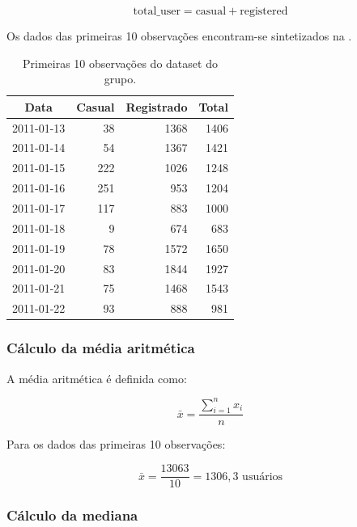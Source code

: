 \documentclass[12pt,a4paper]{article}
\begin{document}
\begin{equation}
\text{total\_user} = \text{casual} + \text{registered}
\end{equation}

Os dados das primeiras 10 observações encontram-se sintetizados na .

\begin{table}[H]
    \centering
    \caption{Primeiras 10 observações do dataset do grupo.}
    \label{tab:primeiras_10}
    \begin{tabular}{crrr}
        \toprule
        \textbf{Data} & \textbf{Casual} & \textbf{Registrado} & \textbf{Total} \\
        \midrule
        2011-01-13 & 38 & 1368 & 1406 \\
        2011-01-14 & 54 & 1367 & 1421 \\
        2011-01-15 & 222 & 1026 & 1248 \\
        2011-01-16 & 251 & 953 & 1204 \\
        2011-01-17 & 117 & 883 & 1000 \\
        2011-01-18 & 9 & 674 & 683 \\
        2011-01-19 & 78 & 1572 & 1650 \\
        2011-01-20 & 83 & 1844 & 1927 \\
        2011-01-21 & 75 & 1468 & 1543 \\
        2011-01-22 & 93 & 888 & 981 \\
        \bottomrule
    \end{tabular}
\end{table}

\subsubsection{Cálculo da média aritmética}

A média aritmética é definida como:

\begin{equation}
\bar{x} = \frac{\sum_{i=1}^{n} x_i}{n}
\end{equation}

Para os dados das primeiras 10 observações:

\begin{equation}
\bar{x} = \frac{13063}{10} = 1306,3 \text{ usuários}
\end{equation}

\subsubsection{Cálculo da mediana}
\end{document}

